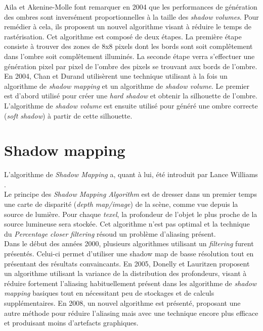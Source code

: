 \documentclass[a4paper,10pt]{report}
\begin{document}
Aila et Akenine-Molle font remarquer en 2004 \cite{aila2004hierarchical} que les performances de génération des ombres sont inversément proportionnelles à la taille des \textit{shadow volumes}. Pour remédier à cela, ils proposent un nouvel algorithme visant à réduire le temps de rastérisation. Cet algorithme est composé de deux étapes. La première étape consiste à trouver des zones de 8x8 pixels dont les bords sont soit compl\^etement dans l'ombre soit compl\^etement illuminés. La seconde étape verra s'effectuer une génération pixel par pixel de l'ombre des pixels se trouvant aux bords de l'ombre.
\\

En 2004, Chan et Durand\cite{chan2004efficient} utilisèrent une technique utilisant à la fois un algorithme de \textit{shadow mapping} et un algorithme de \textit{shadow volume}. Le premier est d'abord utilisé pour créer une \textit{hard shadow} et obtenir la silhouette de l'ombre. L'algorithme de \textit{shadow volume} est ensuite utilisé pour généré une ombre correcte (\textit{soft shadow}) à partir de cette silhouette.


\section{Shadow mapping}

L'algorithme de \textit{Shadow Mapping} a, quant à lui, été introduit par Lance Williams \cite{williams1978casting}.
\\

Le principe des \textit{Shadow Mapping Algorithm} est de dresser dans un premier temps une carte de disparité (\textit{depth map/image}) de la scène, comme vue depuis la source de lumière. Pour chaque \textit{texel}, la profondeur de l'objet le plus proche de la source lumineuse sera stockée. Cet algorithme n'est pas optimal et la technique du \textit{Percentage closer filtering}\cite{reeves1987rendering,fernando2005percentage} résoud un problème d'aliasing présent.
\\

Dans le début des années 2000, plusieurs algorithmes utilisant un \textit{filtering} furent présentés. Celui-ci permet d'utiliser une shadow map de basse résolution tout en présentant des résultats convaincants. En 2005, Donelly et Lauritzen \cite{donnelly2006variance} proposent un algorithme utilisant la variance de la distribution des profondeurs, visant à réduire fortement l'aliasing habituellement présent dans les algorithme de \textit{shadow mapping} basiques tout en nécessitant peu de stockages et de calculs supplémentaires. En 2008, un nouvel algorithme est présenté\cite{annen2008exponential}, proposant une autre méthode pour réduire l'aliasing mais avec une technique encore plus efficace et produisant moins d'artefacts graphiques. 
\\
\end{document}
